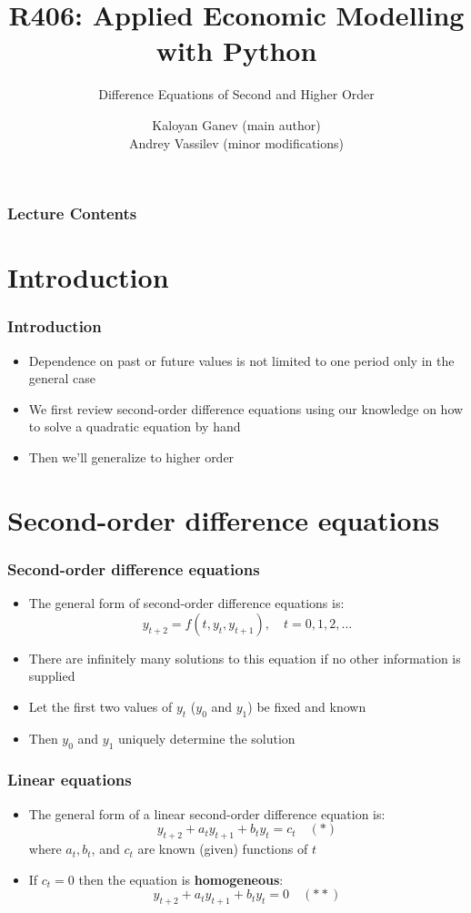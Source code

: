 \documentclass[10pt,usenames,dvipsnames]{beamer}
\title{R406: Applied Economic Modelling with Python}
\subtitle{\textcolor{myred}{Difference Equations of Second and Higher Order}}
\author[Kaloyan Ganev,  Andrey Vassilev]{Kaloyan Ganev (main author) \\
	Andrey Vassilev (minor modifications)}
\date{}
\theoremstyle{plain}
\theoremstyle{definition}
\begin{document}
\maketitle

\begin{frame}[fragile]
\frametitle{Lecture Contents}
\tableofcontents
\end{frame}

\section{Introduction}
\begin{frame}[fragile]
\frametitle{Introduction}
\begin{itemize}
	\item Dependence on past or future values is not limited to one period only in the general case
	\item We first review second-order difference equations using our knowledge on how to solve a quadratic equation by hand
	\item Then we'll generalize to higher order
\end{itemize}
\end{frame}

\section{Second-order difference equations}
\begin{frame}[fragile]
\frametitle{Second-order difference equations}
\begin{itemize}
	\item The general form of second-order difference equations is:
	\[
		y_{t+2} = f(t, y_{t}, y_{t+1}),\quad t = 0,1,2,\ldots
	\]
	\item There are infinitely many solutions to this equation if no other information is supplied
	\item Let the first two values of $y_{t}$ ($y_{0}$ and $y_{1}$) be fixed and known
	\item Then $y_{0}$ and $y_{1}$ uniquely determine the solution
\end{itemize}
\end{frame}

\begin{frame}[fragile]
\frametitle{Linear equations}
\begin{itemize}
	\item The general form of a linear second-order difference equation is:
	\[
		y_{t+2} + a_{t}y_{t+1} + b_{t}y_{t} = c_{t} \quad (*)
	\]
	where $a_{t},b_{t}$, and $c_{t}$ are known (given) functions of $t$
	\item If $c_{t} = 0$ then the equation is \textbf{homogeneous}:
	\[
		y_{t+2} + a_{t}y_{t+1} + b_{t}y_{t} = 0 \quad (**)
	\]
\end{itemize}
\end{frame}
\end{document}
